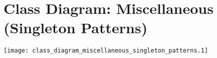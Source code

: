 \section{Class Diagram: Miscellaneous (Singleton Patterns)}
\texttt{[image: class\_diagram\_miscellaneous\_singleton\_patterns.1]} 